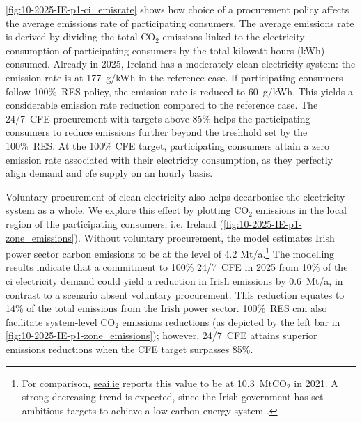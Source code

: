 \documentclass[11pt, 5p, nopreprintline]{elsarticle}
\newcommand{\co}{\ce{CO2}}
\begin{document}
\cref{fig:10-2025-IE-p1-ci_emisrate} shows how choice of a procurement policy affects the average emissions rate of participating consumers.
The average emissions rate is derived by dividing the total CO$_2$ emissions linked to the electricity consumption of participating consumers by the total kilowatt-hours (kWh) consumed.
Already in 2025, Ireland has a moderately clean electricity system: the emission rate is at 177~g\co/kWh in the reference case.
If participating consumers follow 100\%~RES policy, the emission rate is reduced to 60~g\co/kWh.
This yields a considerable emission rate reduction compared to the reference case.
The 24/7~CFE procurement with targets above 85\% helps the participating consumers to reduce emissions further beyond the treshhold set by the 100\%~RES.
At the 100\% CFE target, participating consumers attain a zero emission rate associated with their electricity consumption, as they perfectly align demand and \gls{cfe} supply on an hourly basis.

Voluntary procurement of clean electricity also helps decarbonise the electricity system as a whole.
We explore this effect by plotting CO$_2$ emissions in the local region of the participating consumers, i.e. Ireland (\cref{fig:10-2025-IE-p1-zone_emissions}).
Without voluntary procurement, the model estimates Irish power sector carbon emissions to be at the level of 4.2 Mt\co/a.\footnote{For comparison, \href{https://www.seai.ie/data-and-insights/seai-statistics/key-publications/co2-emissions-report/}{seai.ie} reports this value to be at 10.3~MtCO$_2$ in 2021. A strong decreasing trend is expected, since the Irish government has set ambitious targets to achieve a low-carbon energy system \cite{seaiCOEmissionsReport2020}.}
The modelling results indicate that a commitment to 100\% 24/7~CFE in 2025 from 10\% of the \gls{ci} electricity demand could yield a reduction in Irish emissions by 0.6~Mt\co/a, in contrast to a scenario absent voluntary procurement.
This reduction equates to 14\% of the total emissions from the Irish power sector.
100\%~RES can also facilitate system-level CO$_2$ emissions reductions (as depicted by the left bar in \cref{fig:10-2025-IE-p1-zone_emissions}); however, 24/7~CFE attains superior emissions reductions when the CFE target surpasses 85\%.
\end{document}
